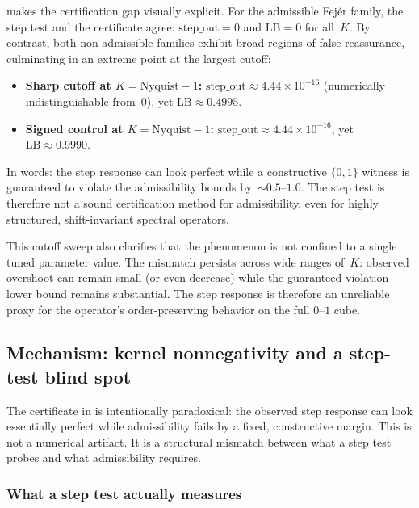 \documentclass[11pt,a4paper]{article}
\theoremstyle{plain}
\theoremstyle{definition}
\theoremstyle{plain}
\newcommand{\stepout}{\mathrm{step\_out}}
\begin{document}
 makes the certification gap visually explicit.  For the
admissible Fej\'er family, the step test and the certificate agree:
$\stepout = 0$ and $\mathrm{LB} = 0$ for all~$K$.  By contrast, both
non-admissible families exhibit broad regions of false reassurance, culminating
in an extreme point at the largest cutoff:

\begin{itemize}[leftmargin=2em]
  \item \textbf{Sharp cutoff at $K = \mathrm{Nyquist}-1$:}\;
    $\stepout \approx 4.44 \times 10^{-16}$ (numerically indistinguishable
    from~$0$), yet $\mathrm{LB} \approx 0.4995$.
  \item \textbf{Signed control at $K = \mathrm{Nyquist}-1$:}\;
    $\stepout \approx 4.44 \times 10^{-16}$, yet
    $\mathrm{LB} \approx 0.9990$.
\end{itemize}

In words: the step response can look perfect while a constructive $\{0,1\}$
witness is guaranteed to violate the admissibility bounds by~${\sim}0.5$--$1.0$.
The step test is therefore not a sound certification method for admissibility,
even for highly structured, shift-invariant spectral operators.

This cutoff sweep also clarifies that the phenomenon is not confined to a single
tuned parameter value.  The mismatch persists across wide ranges of~$K$: observed
overshoot can remain small (or even decrease) while the guaranteed violation
lower bound remains substantial.  The step response is therefore an unreliable
proxy for the operator's order-preserving behavior on the full $0$--$1$ cube.


\subsection{Mechanism: kernel nonnegativity and a step-test blind spot}
\label{sec:mechanism}

The certificate in  is intentionally paradoxical: the observed
step response can look essentially perfect while admissibility fails by a fixed,
constructive margin.  This is not a numerical artifact.  It is a structural
mismatch between what a step test probes and what admissibility requires.


\subsubsection{What a step test actually measures}
\end{document}
